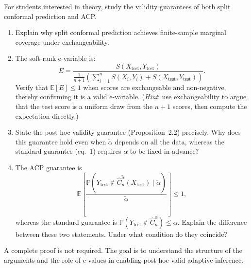 \documentclass[11pt]{article}
\begin{document}
For students interested in theory, study the validity guarantees of both
split conformal prediction and ACP.

\begin{enumerate}

\item Explain why split conformal prediction achieves finite-sample marginal
coverage under exchangeability.

\item The soft-rank e-variable is:
\[
  E = \frac{S(X_{\mathrm{test}},Y_{\mathrm{test}})}
           {\frac{1}{n+1}\!\left(\sum_{i=1}^{n} S(X_i,Y_i)
            + S(X_{\mathrm{test}},Y_{\mathrm{test}})\right)}.
\]
Verify that $\mathbb{E}[E] \le 1$ when scores are exchangeable and
non-negative, thereby confirming it is a valid e-variable.
(\emph{Hint}: use exchangeability to argue that the test score is a uniform
draw from the $n+1$ scores, then compute the expectation directly.)

\item State the post-hoc validity guarantee (Proposition~2.2) precisely.
Why does this guarantee hold even when $\tilde\alpha$ depends on all the
data, whereas the standard guarantee (eq.~1) requires $\alpha$ to be fixed
in advance?

\item The ACP guarantee is
\[
  \mathbb{E}\!\left[\frac{\mathbb{P}(Y_{\mathrm{test}} \notin
  \hat C_n^{\tilde\alpha}(X_{\mathrm{test}}) \mid \tilde\alpha)}
  {\tilde\alpha}\right] \le 1,
\]
whereas the standard guarantee is
$\mathbb{P}(Y_{\mathrm{test}} \notin \hat C_n^\alpha) \le \alpha$.
Explain the difference between these two statements. Under what condition
do they coincide?

\end{enumerate}

A complete proof is not required. The goal is to understand the structure
of the arguments and the role of e-values in enabling post-hoc valid
adaptive inference.
\end{document}
